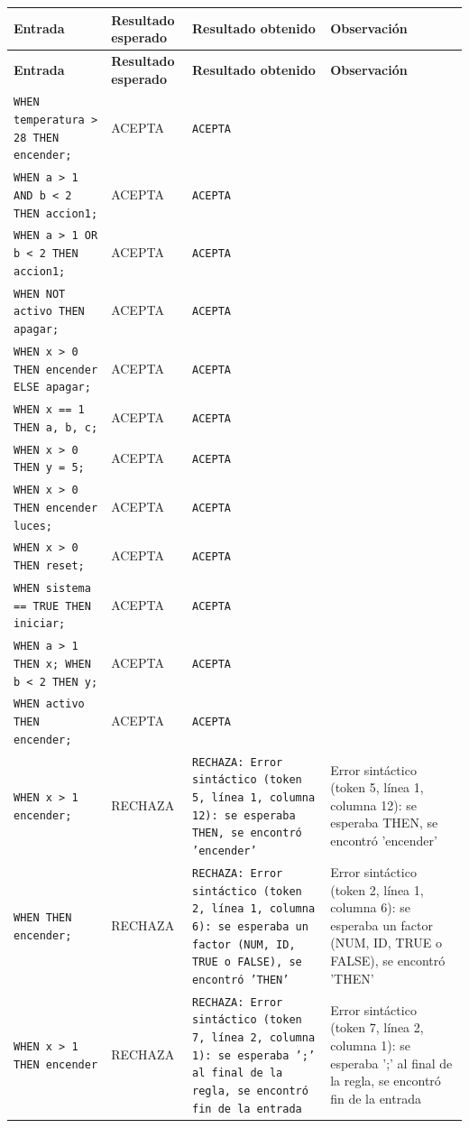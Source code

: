 \begin{longtable}{|p{6cm}|p{2cm}|p{5cm}|p{6cm}|}
\hline
\textbf{Entrada} & \textbf{Resultado esperado} & \textbf{Resultado obtenido} & \textbf{Observación} \\
\hline
\endfirsthead
\hline
\textbf{Entrada} & \textbf{Resultado esperado} & \textbf{Resultado obtenido} & \textbf{Observación} \\
\hline
\endhead
\hline
\endfoot
\texttt{WHEN temperatura > 28 THEN encender;} & ACEPTA & \texttt{ACEPTA} &  \\
\hline
\texttt{WHEN a > 1 AND b < 2 THEN accion1;} & ACEPTA & \texttt{ACEPTA} &  \\
\hline
\texttt{WHEN a > 1 OR b < 2 THEN accion1;} & ACEPTA & \texttt{ACEPTA} &  \\
\hline
\texttt{WHEN NOT activo THEN apagar;} & ACEPTA & \texttt{ACEPTA} &  \\
\hline
\texttt{WHEN x > 0 THEN encender ELSE apagar;} & ACEPTA & \texttt{ACEPTA} &  \\
\hline
\texttt{WHEN x == 1 THEN a, b, c;} & ACEPTA & \texttt{ACEPTA} &  \\
\hline
\texttt{WHEN x > 0 THEN y = 5;} & ACEPTA & \texttt{ACEPTA} &  \\
\hline
\texttt{WHEN x > 0 THEN encender luces;} & ACEPTA & \texttt{ACEPTA} &  \\
\hline
\texttt{WHEN x > 0 THEN reset;} & ACEPTA & \texttt{ACEPTA} &  \\
\hline
\texttt{WHEN sistema == TRUE THEN iniciar;} & ACEPTA & \texttt{ACEPTA} &  \\
\hline
\texttt{WHEN a > 1 THEN x; WHEN b < 2 THEN y;} & ACEPTA & \texttt{ACEPTA} &  \\
\hline
\texttt{WHEN activo THEN encender;} & ACEPTA & \texttt{ACEPTA} &  \\
\hline
\texttt{WHEN x > 1 encender;} & RECHAZA & \texttt{RECHAZA: Error sintáctico (token 5, línea 1, columna 12): se esperaba THEN, se encontró 'encender'} & Error sintáctico (token 5, línea 1, columna 12): se esperaba THEN, se encontró 'encender' \\
\hline
\texttt{WHEN THEN encender;} & RECHAZA & \texttt{RECHAZA: Error sintáctico (token 2, línea 1, columna 6): se esperaba un factor (NUM, ID, TRUE o FALSE), se encontró 'THEN'} & Error sintáctico (token 2, línea 1, columna 6): se esperaba un factor (NUM, ID, TRUE o FALSE), se encontró 'THEN' \\
\hline
\texttt{WHEN x > 1 THEN encender} & RECHAZA & \texttt{RECHAZA: Error sintáctico (token 7, línea 2, columna 1): se esperaba ';' al final de la regla, se encontró fin de la entrada} & Error sintáctico (token 7, línea 2, columna 1): se esperaba ';' al final de la regla, se encontró fin de la entrada \\

\end{longtable}
